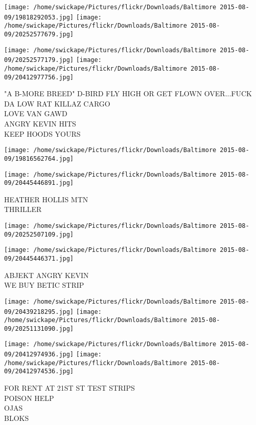 \documentclass[10pt,letterpaper]{article}
\begin{document}
\texttt{[image: /home/swickape/Pictures/flickr/Downloads/Baltimore 2015-08-09/19818292053.jpg]}
\texttt{[image: /home/swickape/Pictures/flickr/Downloads/Baltimore 2015-08-09/20252577679.jpg]}

\texttt{[image: /home/swickape/Pictures/flickr/Downloads/Baltimore 2015-08-09/20252577179.jpg]}
\texttt{[image: /home/swickape/Pictures/flickr/Downloads/Baltimore 2015-08-09/20412977756.jpg]}

"A B{-}MORE BREED" D{-}BIRD FLY HIGH OR GET FLOWN OVER...FUCK DA LOW RAT KILLAZ CARGO\\
LOVE VAN GAWD\\
ANGRY KEVIN HITS\\
KEEP HOODS YOURS\\
\pagebreak

\texttt{[image: /home/swickape/Pictures/flickr/Downloads/Baltimore 2015-08-09/19816562764.jpg]}

\vspace{0.25in}
\texttt{[image: /home/swickape/Pictures/flickr/Downloads/Baltimore 2015-08-09/20445446891.jpg]}

HEATHER HOLLIS MTN\\
THRILLER\\
\pagebreak

\texttt{[image: /home/swickape/Pictures/flickr/Downloads/Baltimore 2015-08-09/20252507109.jpg]}

\vspace{0.25in}
\texttt{[image: /home/swickape/Pictures/flickr/Downloads/Baltimore 2015-08-09/20445446371.jpg]}

ABJEKT ANGRY KEVIN\\
WE BUY BETIC STRIP\\
\pagebreak

\texttt{[image: /home/swickape/Pictures/flickr/Downloads/Baltimore 2015-08-09/20439218295.jpg]}
\texttt{[image: /home/swickape/Pictures/flickr/Downloads/Baltimore 2015-08-09/20251131090.jpg]}

\texttt{[image: /home/swickape/Pictures/flickr/Downloads/Baltimore 2015-08-09/20412974936.jpg]}
\texttt{[image: /home/swickape/Pictures/flickr/Downloads/Baltimore 2015-08-09/20412974536.jpg]}

FOR RENT AT 21ST ST TEST STRIPS\\
POISON HELP\\
OJAS\\
BLOKS\\
\pagebreak
\end{document}
